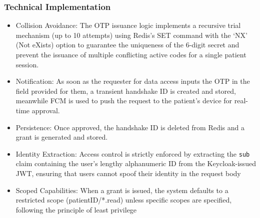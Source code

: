 



\subsubsection{Technical Implementation}
\begin{itemize}
    \item Collision Avoidance: The \ac{OTP} issuance logic implements a recursive trial mechanism (up to 10 attempts) using Redis's SET command with the `NX' (Not eXists) option to guarantee the uniqueness of the 6-digit secret and prevent the issuance of multiple conflicting active codes for a single patient session.
    \item Notification: As soon as the requester for data access inputs the OTP in the field provided for them, a transient handshake ID is created and stored, meanwhile \ac{FCM} is used to push the request to the patient's device for real-time approval.
    \item Persistence: Once approved, the handshake ID is deleted from Redis and a grant is generated and stored.
    \item Identity Extraction: Access control is strictly enforced by extracting the \texttt{sub} claim containing the user's lengthy alphanumeric ID from the Keycloak-issued JWT, ensuring that users cannot spoof their identity in the request body
    \item Scoped Capabilities: When a grant is issued, the system defaults to a restricted scope (patientID/*.read) unless specific scopes are specified, following the principle of least privilege
\end{itemize}


